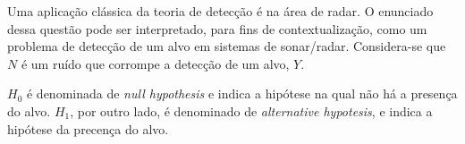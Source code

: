 \documentclass[a4paper,12pt]{article}
\begin{document}
	Uma aplicação clássica da teoria de detecção é na área de radar. O enunciado dessa questão pode ser interpretado, para fins de contextualização, como um problema de detecção de um alvo em sistemas de sonar\slash radar. Considera-se que $N$ é um ruído que corrompe a detecção de um alvo, $Y$.
	
	$H_0$ é denominada de \textit{null hypothesis} e indica a hipótese na qual não há a presença do alvo. $H_1$, por outro lado, é denominado de \textit{alternative hypotesis}, e indica a hipótese da precença do alvo.
\end{document}
